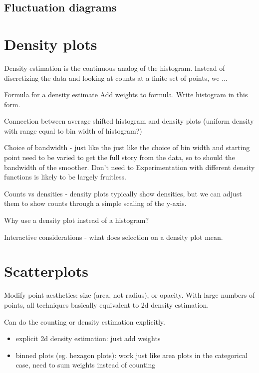 \documentclass[oneside,letterpaper]{scrartcl}
\begin{document}
\subsection{Fluctuation diagrams}\label{sub:fluctuation_diagrams}


\section{Density plots}\label{sec:density_estimation}

Density estimation is the continuous analog of the histogram.  Instead of discretizing the data and looking at counts at a finite set of points, we ...

Formula for a density estimate
Add weights to formula.
Write histogram in this form.

Connection between average shifted histogram and density plots (uniform density with range equal to bin width of histogram?)

Choice of bandwidth - just like the just like the choice of bin width and starting point need to be varied to get the full story from the data, so to should the bandwidth of the smoother.  Don't  need to  Experimentation with different density functions is likely to be largely fruitless.

Counts vs densities - density plots typically show densities, but we can adjust them to show counts through a simple scaling of the y-axis.  

Why use a density plot instead of a histogram?

Interactive considerations - what does selection on a density plot mean.

\section{Scatterplots}\label{sec:scatterplots}
 
Modify point aesthetics: size (area, not radius), or opacity.  With large numbers of points, all techniques basically equivalent to 2d density estimation.  

Can do the counting or density estimation explicitly.  

\begin{itemize}
  \item explicit 2d density estimation: just add weights
  \item binned plots (eg. hexagon plots): work just like area plots in the categorical case, need to sum weights instead of counting
\end{itemize}
\end{document}
